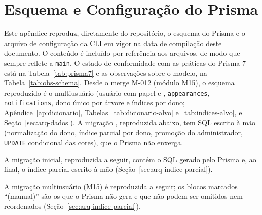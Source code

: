 \chapter{Esquema e Configuração do Prisma}\label{ap:schema}

Este apêndice reproduz, diretamente do repositório, o esquema do Prisma e o arquivo de configuração da CLI em vigor na data de compilação deste documento. O conteúdo é incluído por referência aos arquivos, de modo que sempre reflete a \texttt{main}. O estado de conformidade com as práticas do Prisma 7 está na Tabela~\ref{tab:prisma7} e as observações sobre o modelo, na Tabela~\ref{tab:obs-schema}. Desde o merge M-012 (módulo M15), o esquema reproduzido é o multiusuário (usuário com papel e , \texttt{appearances}, \texttt{notifications}, dono único por árvore e índices por dono; Apêndice~\ref{ap:dicionario}, Tabelas~\ref{tab:dicionario-alvo} e~\ref{tab:indices-alvo}, e Seção~\ref{sec:arq-dados}). A migração , reproduzida abaixo, tem SQL escrito à mão (normalização do dono, índice parcial por dono, promoção do administrador, \texttt{UPDATE} condicional das cores), que o Prisma não enxerga.





A migração inicial, reproduzida a seguir, contém o SQL gerado pelo Prisma e, ao final, o índice parcial escrito à mão (Seção~\ref{sec:arq-indice-parcial}).



A migração multiusuário (M15) é reproduzida a seguir; os blocos marcados ``(manual)'' são os que o Prisma não gera e que não podem ser omitidos nem reordenados (Seção~\ref{sec:arq-indice-parcial}).

